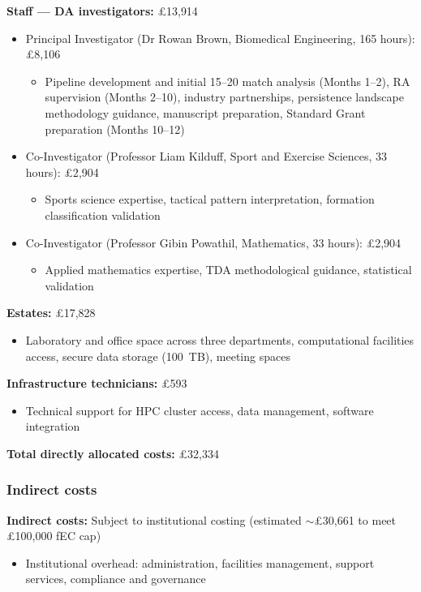 \textbf{Staff --- DA investigators:} \pounds13{,}914
\begin{itemize}
  \item Principal Investigator (Dr Rowan Brown, Biomedical Engineering, 165 hours): \pounds8{,}106
  \begin{itemize}[nosep]
    \item Pipeline development and initial 15--20 match analysis (Months 1--2), RA supervision (Months 2--10), industry partnerships, persistence landscape methodology guidance, manuscript preparation, Standard Grant preparation (Months 10--12)
  \end{itemize}
  \item Co-Investigator (Professor Liam Kilduff, Sport and Exercise Sciences, 33 hours): \pounds2{,}904
  \begin{itemize}[nosep]
    \item Sports science expertise, tactical pattern interpretation, formation classification validation
  \end{itemize}
  \item Co-Investigator (Professor Gibin Powathil, Mathematics, 33 hours): \pounds2{,}904
  \begin{itemize}[nosep]
    \item Applied mathematics expertise, TDA methodological guidance, statistical validation
  \end{itemize}
\end{itemize}

\textbf{Estates:} \pounds17{,}828
\begin{itemize}
  \item Laboratory and office space across three departments, computational facilities access, secure data storage (100~TB), meeting spaces
\end{itemize}

\textbf{Infrastructure technicians:} \pounds593
\begin{itemize}
  \item Technical support for HPC cluster access, data management, software integration
\end{itemize}

\textbf{Total directly allocated costs:} \pounds32{,}334

\subsubsection{Indirect costs}

\textbf{Indirect costs:} Subject to institutional costing (estimated $\sim$\pounds30{,}661 to meet \pounds100{,}000 fEC cap)
\begin{itemize}
  \item Institutional overhead: administration, facilities management, support services, compliance and governance
\end{itemize}

